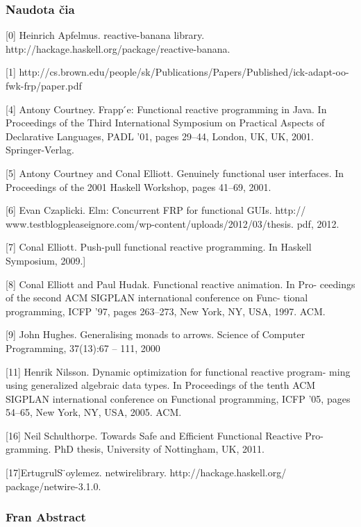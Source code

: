 \subsubsection{Naudota čia}

[0] Heinrich Apfelmus. reactive-banana library. http://hackage.haskell.org/package/reactive-banana.

[1] http://cs.brown.edu/people/sk/Publications/Papers/Published/ick-adapt-oo-fwk-frp/paper.pdf

[4] Antony Courtney. Frapp ́e: Functional reactive programming in Java. In
Proceedings of the Third International Symposium on Practical Aspects of Declarative Languages, PADL ’01, pages 29–44, London, UK, UK, 2001. Springer-Verlag.

[5] Antony Courtney and Conal Elliott. Genuinely functional user interfaces. In Proceedings of the 2001 Haskell Workshop, pages 41–69, 2001.

[6] Evan Czaplicki. Elm: Concurrent FRP for functional GUIs. http:// www.testblogpleaseignore.com/wp-content/uploads/2012/03/thesis. pdf, 2012.


[7] Conal Elliott. Push-pull functional reactive programming. In Haskell Symposium, 2009.]

[8] Conal Elliott and Paul Hudak. Functional reactive animation. In Pro- ceedings of the second ACM SIGPLAN international conference on Func- tional programming, ICFP ’97, pages 263–273, New York, NY, USA, 1997. ACM.

[9] John Hughes. Generalising monads to arrows. Science of Computer Programming, 37(13):67 – 111, 2000

[11] Henrik Nilsson. Dynamic optimization for functional reactive program- ming using generalized algebraic data types. In Proceedings of the tenth ACM SIGPLAN international conference on Functional programming, ICFP ’05, pages 54–65, New York, NY, USA, 2005. ACM.

[16] Neil Schulthorpe. Towards Safe and Efficient Functional Reactive Pro- gramming. PhD thesis, University of Nottingham, UK, 2011.


[17]ErtugrulS ̈oylemez. netwirelibrary. http://hackage.haskell.org/ package/netwire-3.1.0.


\subsubsection{Fran Abstract}


